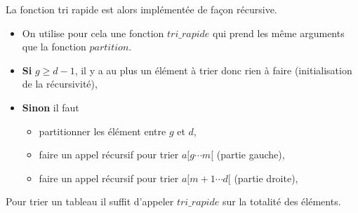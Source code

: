 La fonction tri rapide est alors implémentée de façon récursive.
\begin{itemize}
\item On utilise pour cela une fonction \textbf{$tri\_rapide$} qui prend les même arguments que la fonction \textbf{$partition$}.
\item \textbf{Si} \textbf{$g\geq d-1$}, il y a au plus un élément à trier donc rien à faire (initialisation de la récursivité),
\item \textbf{Sinon} il faut
\begin{itemize}
\item partitionner les élément entre \textbf{$g$} et \textbf{$d$},
\item faire un appel récursif pour trier $a[g\cdots m[$ (partie gauche),
\item faire un appel récursif pour trier $a[m+1\cdots d[$ (partie droite),
\end{itemize} 
\end{itemize} 



Pour trier un tableau il suffit d'appeler \textbf{$tri\_rapide$} sur la totalité des éléments.


%
%
%

